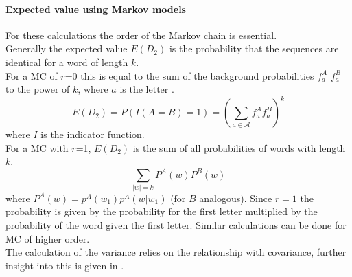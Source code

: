 \documentclass[twocolumn]{bmcart}%
\begin{document}
\paragraph*{Expected value using Markov models}
For these calculations the order of the Markov chain is essential.\\
Generally the expected value $E(D_2)$ is the probability that the sequences are identical for a word of length $k$. \\
For a MC of $r$=0 this is equal to  the sum of the background probabilities $f_a^A$ $f_a^B$ to the power of $k$, where $a$ is the letter .
$$E(D_2)=P(I(A=B)=1)=\left(\sum_{a \in \mathcal{A}}f_a^Af_a^B\right)^k$$
where $I$ is the indicator function.\\
For a MC with $r$=1, $E(D_2)$ is the sum of all probabilities of words with length $k$. $$\sum_{|w|=k}P^A(w)P^B(w)$$
where $P^A(w)=p^A(w_1)p^A(w|w_1)$ (for $B$ analogous). Since $r=1$ the probability is given by the probability for the first letter multiplied by the probability of the word given the first letter. Similar calculations can be done for MC of higher order.\\
The calculation of the variance relies on the relationship with covariance, further insight into this is given in \cite{kantorovitz2007statistical}.
\end{document}
